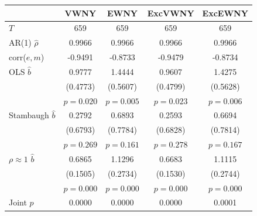 \begin{tabular}{lcccc}
\toprule
 & VWNY & EWNY & ExcVWNY & ExcEWNY \\
\midrule
$T$ & 659 & 659 & 659 & 659 \\
AR(1) $\hat\rho$ & 0.9966 & 0.9966 & 0.9966 & 0.9966 \\
corr($e,m$) & -0.9491 & -0.8733 & -0.9479 & -0.8734 \\
\midrule
OLS $\hat b$ & 0.9777 & 1.4444 & 0.9607 & 1.4275 \\
 & (0.4773) & (0.5607) & (0.4799) & (0.5628) \\
 & $p=0.020$ & $p=0.005$ & $p=0.023$ & $p=0.006$ \\
Stambaugh $\hat b$ & 0.2792 & 0.6893 & 0.2593 & 0.6694 \\
 & (0.6793) & (0.7784) & (0.6828) & (0.7814) \\
 & $p=0.269$ & $p=0.161$ & $p=0.278$ & $p=0.167$ \\
$\rho\approx1$ $\hat b$ & 0.6865 & 1.1296 & 0.6683 & 1.1115 \\
 & (0.1505) & (0.2734) & (0.1530) & (0.2744) \\
 & $p=0.000$ & $p=0.000$ & $p=0.000$ & $p=0.000$ \\
\midrule
Joint $p$ & 0.0000 & 0.0000 & 0.0000 & 0.0001 \\
\bottomrule
\end{tabular}
